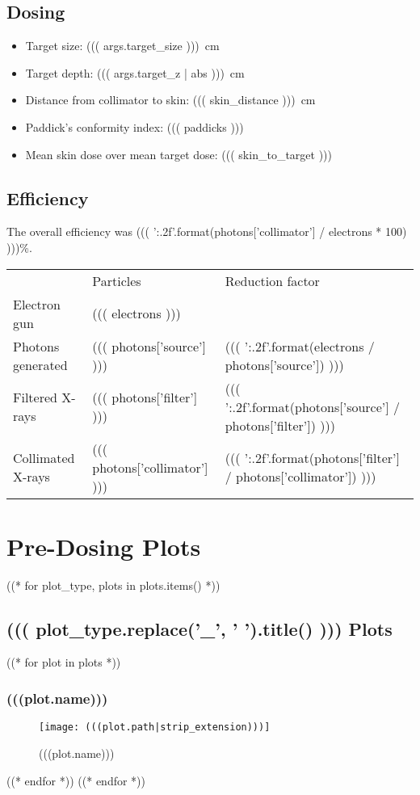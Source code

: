 \documentclass[12pt]{article}
\begin{document}
\subsection{Dosing}
\begin{itemize}
	\item Target size: \SI{((( args.target_size )))}{\cm}
	\item Target depth: \SI{((( args.target_z | abs )))}{\cm}
	\item Distance from collimator to skin: \SI{((( skin_distance )))}{\cm}
	\item Paddick's conformity index: ((( paddicks )))
	\item Mean skin dose over mean target dose: ((( skin_to_target )))
\end{itemize}

\subsection{Efficiency}
The overall efficiency was ((( '{:.2f}'.format(photons['collimator'] / electrons * 100) )))\%.
\begin{tabular}{l | l | l}
	& Particles & Reduction factor \\
	Electron gun & ((( electrons ))) & \\
	Photons generated & ((( photons['source'] ))) & ((( '{:.2f}'.format(electrons / photons['source']) ))) \\
	Filtered X-rays & ((( photons['filter'] ))) & ((( '{:.2f}'.format(photons['source'] / photons['filter']) ))) \\
	Collimated X-rays & ((( photons['collimator'] ))) & ((( '{:.2f}'.format(photons['filter'] / photons['collimator']) )))
\end{tabular}

\section{Pre-Dosing Plots}
((* for plot_type, plots in plots.items() *))
	\subsection{((( plot_type.replace('_', ' ').title() ))) Plots}
		((* for plot in plots *))
			\subsubsection{(((plot.name)))}
			\begin{figure}[H]
			\centering
			\texttt{[image: (((plot.path|strip\_extension)))]}
			\caption{(((plot.name)))}
			\label{fig:(((plot.slug)))}
			\end{figure}
		((* endfor *))
((* endfor *))
\end{document}
